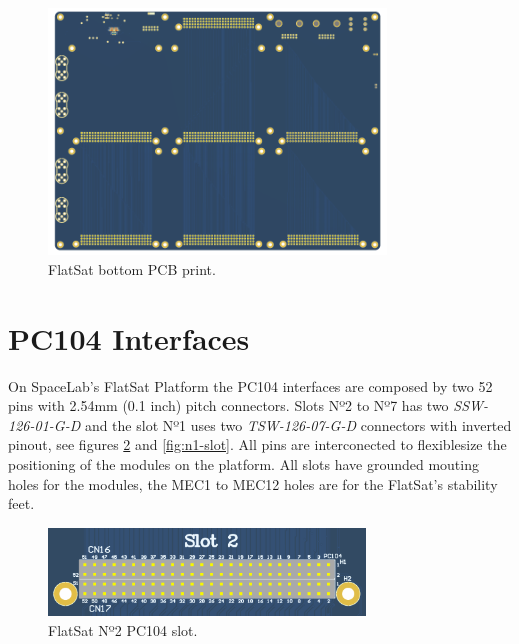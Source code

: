 \begin{figure}[!ht]
    \begin{center}
        \includegraphics[width=0.8\textwidth]{figures/flatsat_bottom_image.png}
        \caption{FlatSat bottom PCB print.}
        \label{fig:pcb-bottom}
    \end{center}
\end{figure}

\section{PC104 Interfaces}

On SpaceLab's FlatSat Platform the PC104 interfaces are composed by two 52 pins with 2.54mm (0.1 inch) pitch connectors. Slots Nº2 to Nº7 has two \textit{SSW-126-01-G-D} and the slot Nº1 uses two \textit{TSW-126-07-G-D} connectors with inverted pinout, see figures \ref{fig:n2-n7-slots} and \ref{fig:n1-slot}. All pins are interconected to flexiblesize the positioning of the modules on the platform. All slots have grounded mouting holes for the modules, the MEC1 to MEC12 holes are for the FlatSat's stability feet.

\begin{figure}[!ht]
    \begin{center}
        \includegraphics[width=0.75\textwidth]{figures/pc104_slots_n2_to_n7.png}
        \caption{FlatSat Nº2 PC104 slot.}
        \label{fig:n2-n7-slots}
    \end{center}
\end{figure}

